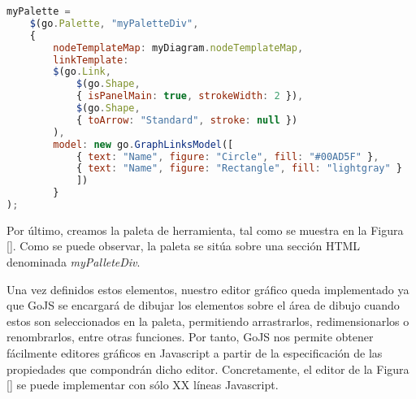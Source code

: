 \begin{lstlisting}[language=JavaScript]
myPalette =
	$(go.Palette, "myPaletteDiv",  
	{
		nodeTemplateMap: myDiagram.nodeTemplateMap,  
		linkTemplate: 
		$(go.Link,
			$(go.Shape, 
			{ isPanelMain: true, strokeWidth: 2 }),
			$(go.Shape,  
			{ toArrow: "Standard", stroke: null })
		),
		model: new go.GraphLinksModel([  
			{ text: "Name", figure: "Circle", fill: "#00AD5F" },
			{ text: "Name", figure: "Rectangle", fill: "lightgray" }
			])
		}
);
\end{lstlisting}

Por último, creamos la paleta de herramienta, tal como se muestra en la Figura \ref{}. Como se puede observar, la paleta se sitúa sobre una sección HTML denominada \emph{myPalleteDiv}. 


Una vez definidos estos elementos, nuestro editor gráfico queda implementado ya que GoJS se encargará de dibujar los elementos sobre el área de dibujo cuando estos son seleccionados en la paleta, permitiendo arrastrarlos, redimensionarlos o renombrarlos, entre otras funciones. Por tanto, GoJS nos permite obtener fácilmente editores gráficos en Javascript a partir de la especificación
de las propiedades que compondrán dicho editor. Concretamente, el editor de la Figura \ref{} se puede implementar con sólo XX líneas Javascript.     